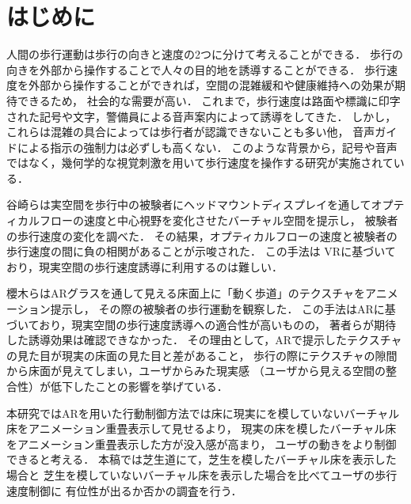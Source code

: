 \documentclass[dvipdfmx]{jsarticle}
\begin{document}

\vspace{3mm}

\section{はじめに}
人間の歩行運動は歩行の向きと速度の2つに分けて考えることができる．
歩行の向きを外部から操作することで人々の目的地を誘導することができる．
歩行速度を外部から操作することができれば，空間の混雑緩和や健康維持への効果が期待できるため，
社会的な需要が高い．
これまで，歩行速度は路面や標識に印字された記号や文字，警備員による音声案内によって誘導をしてきた．
しかし，これらは混雑の具合によっては歩行者が認識できないことも多い他，
音声ガイドによる指示の強制力は必ずしも高くない．
このような背景から，記号や音声ではなく，幾何学的な視覚刺激を用いて歩行速度を操作する研究が実施されている．

谷崎らは実空間を歩行中の被験者にヘッドマウントディスプレイを通してオプティカルフローの速度と中心視野を変化させたバーチャル空間を提示し，
被験者の歩行速度の変化を調べた\cite{article2}．
その結果，オプティカルフローの速度と被験者の歩行速度の間に負の相関があることが示唆された．
この手法は VRに基づいており，現実空間の歩行速度誘導に利用するのは難しい．


櫻木らはARグラスを通して見える床面上に「動く歩道」のテクスチャをアニメーション提示し，
その際の被験者の歩行運動を観察した\cite{article1}．
この手法はARに基づいており，現実空間の歩行速度誘導への適合性が高いものの，
著者らが期待した誘導効果は確認できなかった．
その理由として，ARで提示したテクスチャの見た目が現実の床面の見た目と差があること，
歩行の際にテクスチャの隙間から床面が見えてしまい，ユーザからみた現実感
（ユーザから見える空間の整合性）が低下したことの影響を挙げている．

本研究ではARを用いた行動制御方法では床に現実にを模していないバーチャル床をアニメーション重畳表示して見せるより，
現実の床を模したバーチャル床をアニメーション重畳表示した方が没入感が高まり，
ユーザの動きをより制御できると考える．
本稿では芝生道にて，芝生を模したバーチャル床を表示した場合と
芝生を模していないバーチャル床を表示した場合を比べてユーザの歩行速度制御に
有位性が出るか否かの調査を行う．
\end{document}

